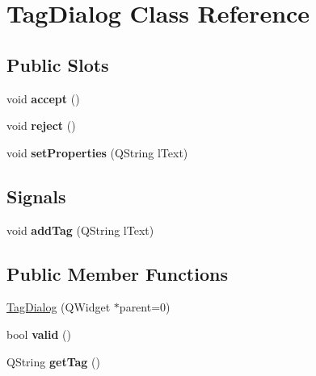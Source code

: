\hypertarget{classTagDialog}{
\section{TagDialog Class Reference}
\label{classTagDialog}
}
\subsection*{Public Slots}
\begin{DoxyCompactItemize}
\item 
\hypertarget{classTagDialog_af311b8fb8977a681a2cb50c45e0efb8a}{
void {\bfseries accept} ()}
\label{classTagDialog_af311b8fb8977a681a2cb50c45e0efb8a}

\item 
\hypertarget{classTagDialog_a82e25d439c232c6fdde99db51c2b0f32}{
void {\bfseries reject} ()}
\label{classTagDialog_a82e25d439c232c6fdde99db51c2b0f32}

\item 
\hypertarget{classTagDialog_a2ec0953673bceb9c140d24ac1665d4c6}{
void {\bfseries setProperties} (QString lText)}
\label{classTagDialog_a2ec0953673bceb9c140d24ac1665d4c6}

\end{DoxyCompactItemize}
\subsection*{Signals}
\begin{DoxyCompactItemize}
\item 
\hypertarget{classTagDialog_a839e5caebd5ff558d0be1d52b6ecbc54}{
void {\bfseries addTag} (QString lText)}
\label{classTagDialog_a839e5caebd5ff558d0be1d52b6ecbc54}

\end{DoxyCompactItemize}
\subsection*{Public Member Functions}
\begin{DoxyCompactItemize}
\item 
\hyperlink{classTagDialog_a702e9c09ec9600cdf6442bc05126a8ff}{TagDialog} (QWidget $\ast$parent=0)
\item 
\hypertarget{classTagDialog_a0bd7285aa4afd2a05872abf7b30e5a85}{
bool {\bfseries valid} ()}
\label{classTagDialog_a0bd7285aa4afd2a05872abf7b30e5a85}

\item 
\hypertarget{classTagDialog_a25cceac310e671c09f78df845f8ef664}{
QString {\bfseries getTag} ()}
\label{classTagDialog_a25cceac310e671c09f78df845f8ef664}

\end{DoxyCompactItemize}


